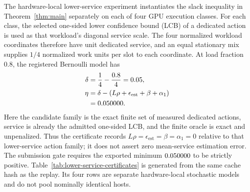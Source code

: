 \documentclass[opre,dblanonrev]{informs4}
\begin{document}
The hardware-local lower-service experiment instantiates the slack inequality
in Theorem~\ref{thm:main} separately on each of four GPU execution classes.
For each class, the selected one-sided lower confidence bound (LCB) of a
dedicated action is used as that workload's diagonal service scale.  The four
normalized workload coordinates therefore have unit dedicated service, and an
equal stationary mix supplies \(1/4\) normalized work units per slot to each
coordinate.  At load fraction 0.8, the registered Bernoulli model has
\begin{equation}
  \begin{aligned}
  \delta
    &=\frac{1}{4}-\frac{0.8}{4}=0.05,\\
  \eta
    &=\delta-(L\rho+\epsilon_{\mathrm{est}}+\beta+\alpha_1)\\
    &=0.050000.
  \end{aligned}
  \label{eq:hardware-local-slack}
\end{equation}
Here the candidate family is the exact finite set of measured dedicated
actions, service is already the admitted one-sided LCB, and the finite oracle
is exact and unpenalized.  Thus the certificate records
\(L\rho=\epsilon_{\mathrm{est}}=\beta=\alpha_1=0\) relative to that
lower-service action family; it does not assert zero mean-service estimation
error.  The submission gate requires the exported minimum
\(0.050000\) to be strictly positive.  Table~\ref{tab:lower-service-certificates} is generated from the same
cache hash as the replay.  Its four rows are separate hardware-local stochastic
models and do not pool nominally identical hosts.

\begin{table}[t]
\end{table}
\end{document}

